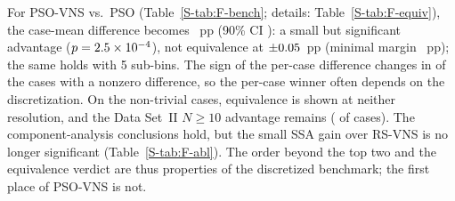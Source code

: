 For PSO-VNS vs.\ PSO (Table~\ref{S-tab:F-bench}; details: Table~\ref{S-tab:F-equiv}), the case-mean difference becomes \NFPairMeanOne~pp (90\% CI \NFPairCIOne): a small but significant advantage ($p=2.5\times10^{-4}$), not equivalence at $\pm0.05$~pp (minimal margin \NFPairMinMarginOne~pp); the same holds with 5\textdegree{} sub-bins. The sign of the per-case difference changes in \NFSignChangesOne{} of the \NFSignChangesBase{} cases with a nonzero difference, so the per-case winner often depends on the discretization. On the \NFNonTrivN{} non-trivial cases, equivalence is shown at neither resolution, and the Data Set~II $N\ge10$ advantage remains (\NFDSIINTenWinsOne{} of \NFDSIINTenN{} cases). The component-analysis conclusions hold, but the small SSA gain over RS-VNS is no longer significant (Table~\ref{S-tab:F-abl}). The order beyond the top two and the equivalence verdict are thus properties of the discretized benchmark; the first place of PSO-VNS is not.
